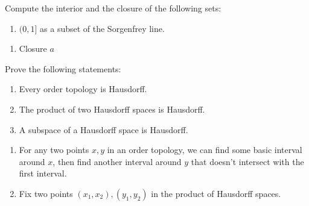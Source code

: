 \documentclass[../main.tex]{subfiles}
\begin{document}
\begin{problem}
    Compute the interior and the closure of the following sets:
    \begin{enumerate}[label=(\alph*)]
        \item $(0, 1]$ as a subset of the Sorgenfrey line.
    \end{enumerate}
\end{problem}
\begin{enumerate}[label=(\alph*)]
    \item Closure $a$
\end{enumerate}

\begin{problem}
\end{problem}

\begin{problem}
    Prove the following statements:
    \begin{enumerate}[label=(\alph*)]
        \item Every order topology is Hausdorff.
        \item The product of two Hausdorff spaces is Hausdorff.
        \item A subspace of a Hausdorff space is Hausdorff.
    \end{enumerate}
\end{problem}
\begin{enumerate}[label=(\alph*)]
    \item For any two points $x, y$ in an order topology, we can find some basic interval around $x$, then find another interval around $y$ that doesn't intersect with the first interval.
    \item Fix two points $(x_1, x_2), (y_1, y_2)$ in the product of Hausdorff spaces.
\end{enumerate}

\begin{problem}
\end{problem}
\end{document}
